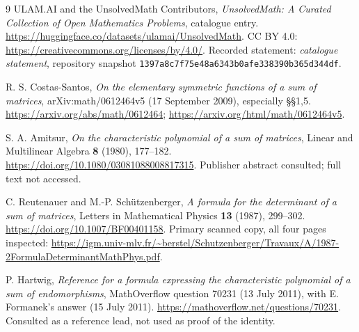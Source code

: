 \documentclass[11pt]{article}
\begin{document}
\begin{thebibliography}{9}
ULAM.AI and the UnsolvedMath Contributors,
\emph{UnsolvedMath: A Curated Collection of Open Mathematics Problems},
catalogue entry.
\url{https://huggingface.co/datasets/ulamai/UnsolvedMath}.
CC BY 4.0: \url{https://creativecommons.org/licenses/by/4.0/}.
Recorded statement: \textit{catalogue statement},
repository snapshot \texttt{1397a8c7f75e48a6343b0afe338390b365d344df}.

R. S. Costas-Santos,
\emph{On the elementary symmetric functions of a sum of matrices},
arXiv:math/0612464v5 (17 September 2009), especially \S\S1,5.
\url{https://arxiv.org/abs/math/0612464};
\url{https://arxiv.org/html/math/0612464v5}.

S. A. Amitsur,
\emph{On the characteristic polynomial of a sum of matrices},
Linear and Multilinear Algebra \textbf{8} (1980), 177--182.
\url{https://doi.org/10.1080/03081088008817315}.
Publisher abstract consulted; full text not accessed.

C. Reutenauer and M.-P. Sch\"utzenberger,
\emph{A formula for the determinant of a sum of matrices},
Letters in Mathematical Physics \textbf{13} (1987), 299--302.
\url{https://doi.org/10.1007/BF00401158}.
Primary scanned copy, all four pages inspected:
\url{https://igm.univ-mlv.fr/~berstel/Schutzenberger/Travaux/A/1987-2FormulaDeterminantMathPhys.pdf}.

P. Hartwig, \emph{Reference for a formula expressing the characteristic
polynomial of a sum of endomorphisms}, MathOverflow question 70231
(13 July 2011), with E. Formanek's answer (15 July 2011).
\url{https://mathoverflow.net/questions/70231}.
Consulted as a reference lead, not used as proof of the identity.
\end{thebibliography}
\end{document}
